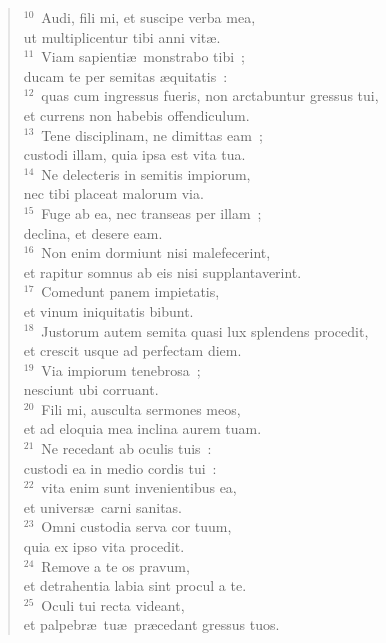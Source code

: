 \begin{flushleft}\begin{verse}${}^{10}$~Audi, fili mi, et suscipe verba mea,\\ ut multiplicentur tibi anni vit\ae .\\
${}^{11}$~Viam sapienti\ae\ monstrabo tibi~;\\ ducam te per semitas \ae quitatis~:\\
${}^{12}$~quas cum ingressus fueris, non arctabuntur gressus tui,\\ et currens non habebis offendiculum.\\
${}^{13}$~Tene disciplinam, ne dimittas eam~;\\ custodi illam, quia ipsa est vita tua.\\
${}^{14}$~Ne delecteris in semitis impiorum,\\ nec tibi placeat malorum via.\\
${}^{15}$~Fuge ab ea, nec transeas per illam~;\\ declina, et desere eam.\\
${}^{16}$~Non enim dormiunt nisi malefecerint,\\ et rapitur somnus ab eis nisi supplantaverint.\\
${}^{17}$~Comedunt panem impietatis,\\ et vinum iniquitatis bibunt.\\
${}^{18}$~Justorum autem semita quasi lux splendens procedit,\\ et crescit usque ad perfectam diem.\\
${}^{19}$~Via impiorum tenebrosa~;\\ nesciunt ubi corruant.\\
${}^{20}$~Fili mi, ausculta sermones meos,\\ et ad eloquia mea inclina aurem tuam.\\
${}^{21}$~Ne recedant ab oculis tuis~:\\ custodi ea in medio cordis tui~:\\
${}^{22}$~vita enim sunt invenientibus ea,\\ et univers\ae\ carni sanitas.\\
${}^{23}$~Omni custodia serva cor tuum,\\ quia ex ipso vita procedit.\\
${}^{24}$~Remove a te os pravum,\\ et detrahentia labia sint procul a te.\\
${}^{25}$~Oculi tui recta videant,\\ et palpebr\ae\ tu\ae\ pr\ae cedant gressus tuos.\\

\end{verse}
\end{flushleft}
